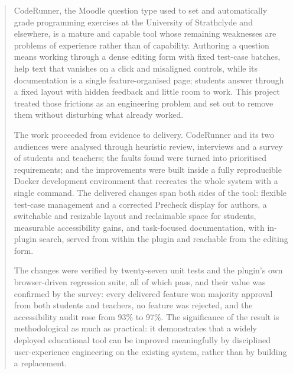 
\begin{abstract}

CodeRunner, the Moodle question type used to set and automatically grade programming exercises at the University of Strathclyde and elsewhere, is a mature and capable tool whose remaining weaknesses are problems of experience rather than of capability. Authoring a question means working through a dense editing form with fixed test-case batches, help text that vanishes on a click and misaligned controls, while its documentation is a single feature-organised page; students answer through a fixed layout with hidden feedback and little room to work. This project treated those frictions as an engineering problem and set out to remove them without disturbing what already worked.

The work proceeded from evidence to delivery. CodeRunner and its two audiences were analysed through heuristic review, interviews and a survey of students and teachers; the faults found were turned into prioritised requirements; and the improvements were built inside a fully reproducible Docker development environment that recreates the whole system with a single command. The delivered changes span both sides of the tool: flexible test-case management and a corrected Precheck display for authors, a switchable and resizable layout and reclaimable space for students, measurable accessibility gains, and task-focused documentation, with in-plugin search, served from within the plugin and reachable from the editing form.

The changes were verified by twenty-seven unit tests and the plugin's own browser-driven regression suite, all of which pass, and their value was confirmed by the survey: every delivered feature won majority approval from both students and teachers, no feature was rejected, and the accessibility audit rose from 93\% to 97\%. The significance of the result is methodological as much as practical: it demonstrates that a widely deployed educational tool can be improved meaningfully by disciplined user-experience engineering on the existing system, rather than by building a replacement.

\end{abstract}



